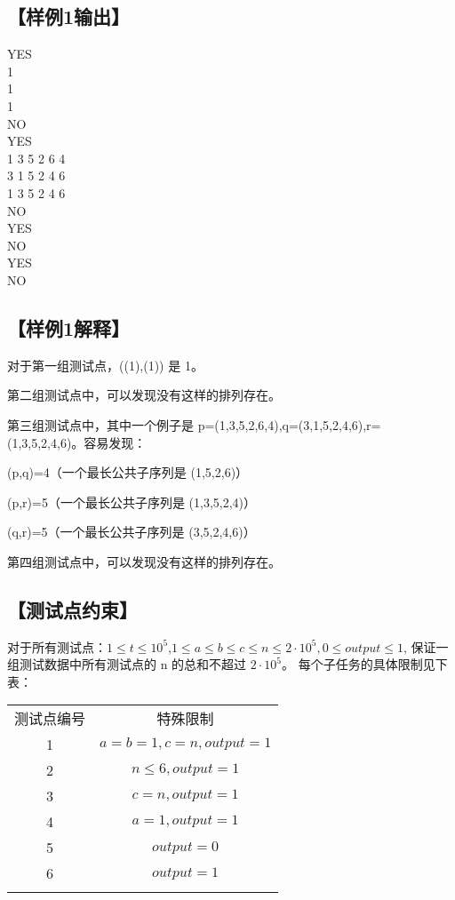 \documentclass{statement}
\begin{document}
\subsection[样例1输出]{【样例1输出】}
\begin{example}
YES\\
1\\
1\\
1\\
NO\\
YES\\
1 3 5 2 6 4\\
3 1 5 2 4 6\\
1 3 5 2 4 6\\
NO\\
YES\\
NO\\
YES\\
NO
\end{example}
\subsection[样例1解释]{【样例1解释】}
对于第一组测试点，((1),(1)) 是 1。

第二组测试点中，可以发现没有这样的排列存在。

第三组测试点中，其中一个例子是 p=(1,3,5,2,6,4),q=(3,1,5,2,4,6),r=(1,3,5,2,4,6)。容易发现：

(p,q)=4（一个最长公共子序列是 (1,5,2,6)）

(p,r)=5（一个最长公共子序列是 (1,3,5,2,4)）

(q,r)=5（一个最长公共子序列是 (3,5,2,4,6)）

第四组测试点中，可以发现没有这样的排列存在。

\subsection[测试点约束]{【测试点约束】}
对于所有测试点：$1\le t\le 10^5$,$ 1\le a\le b\le c\le n\le 2\cdot 10^5,0\le output\le 1$,
	保证一组测试数据中所有测试点的 n 的总和不超过 $2 \cdot 10^5$。
    每个子任务的具体限制见下表：
\begin{center}
	\begin{tabular}{|c|c|}
		\Xhline{5\arrayrulewidth}
		测试点编号 & 特殊限制\\
		\Xhline{3\arrayrulewidth}
		1  &  $a=b=1,c=n,output=1$\\
		\hline
		2 & $n\le6,output=1$\\
		\hline
		3 & $c=n,output=1$\\
		\hline
		4 &  $a=1,output=1$\\
		\hline
		5 &  $output=0$\\
		\hline
		6 &  $output=1$\\		
		\Xhline{5\arrayrulewidth}
	\end{tabular}
\end{center}
\end{document}
